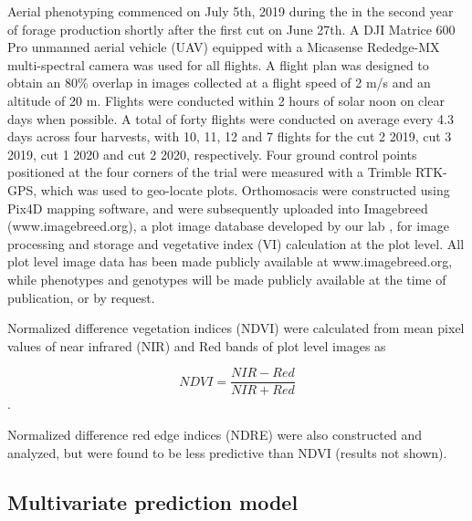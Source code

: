 \documentclass[12pt, letterpaper]{article}
\begin{document}
Aerial phenotyping commenced on July 5th, 2019 during the in the second year of forage production shortly after the first cut on June 27th. A DJI Matrice 600 Pro unmanned aerial vehicle (UAV) equipped with a Micasense Rededge-MX multi-spectral camera was used for all flights. A flight plan was designed to obtain an 80\% overlap in images collected at a flight speed of 2 m/s and an altitude of 20 m. Flights were conducted within 2 hours of solar noon on clear days when possible. A total of forty flights were conducted on average every 4.3 days across four harvests, with 10, 11, 12 and 7 flights for the cut 2 2019, cut 3 2019, cut 1 2020 and cut 2 2020, respectively. Four ground control points positioned at the four corners of the trial were measured with a Trimble RTK-GPS, which was used to geo-locate plots. Orthomosacis were constructed using Pix4D mapping software, and were subsequently uploaded into Imagebreed (www.imagebreed.org), a plot image database developed by our lab \parencite{morales2020}, for image processing and storage and vegetative index (VI) calculation at the plot level. All plot level image data has been made publicly available at www.imagebreed.org, while phenotypes and genotypes will be made publicly available at the time of publication, or by request.


Normalized difference vegetation indices (NDVI) were calculated from mean pixel values of near infrared (NIR) and Red bands of plot level images as

\begin{equation}
	NDVI = \frac{NIR - Red}{NIR + Red}
\end{equation}.

Normalized difference red edge indices (NDRE) were also constructed and analyzed, but were found to be less predictive than NDVI (results not shown). 


\subsection{Multivariate prediction model}


\end{document}
